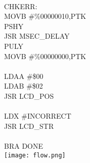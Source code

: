 \documentclass[11pt,a4paper]{article}
\begin{document}
{\\
CHKERR:\\
\hspace*{1.5cm}MOVB    \#\%00000010,PTK\\
\hspace*{1.5cm}PSHY\\
\hspace*{1.5cm}JSR      MSEC\_DELAY\\
\hspace*{1.5cm}PULY\\
\hspace*{1.5cm}MOVB    \#\%00000000,PTK\\
\\
\hspace*{1.5cm}LDAA	\#\$00\\
\hspace*{1.5cm}LDAB	\#\$02\\
\hspace*{1.5cm}JSR	LCD\_POS\\
\\
\hspace*{1.5cm}LDX	\#INCORRECT\\
\hspace*{1.5cm}JSR	LCD\_STR\\
\\
\hspace*{1.5cm}BRA 	DONE\\

\texttt{[image: flow.png]}
}
\end{document}
